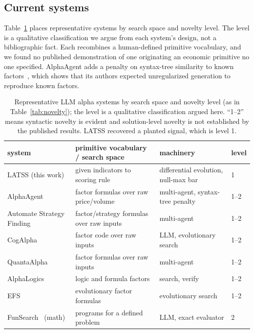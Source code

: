 \documentclass[11pt]{article}
\begin{document}
\subsection{Current systems}
\label{sec:audit}

Table~\ref{tab:audit} places representative systems by search space and novelty level. The level is a
qualitative classification we argue from each system's design, not a bibliographic fact. Each
recombines a human-defined primitive vocabulary, and we found no published demonstration of one
originating an economic primitive no one specified. AlphaAgent adds a penalty on syntax-tree similarity
to known factors~\cite{alphaagent}, which shows that its authors expected unregularized generation to
reproduce known factors.

\begin{table}[htbp]
\centering
\caption{Representative LLM alpha systems by search space and novelty level (as in
Table~\ref{tab:novelty}); the level is a qualitative classification argued here. ``1--2'' means
syntactic novelty is evident and solution-level novelty is not established by the published results.
LATSS recovered a planted signal, which is level 1.}
\label{tab:audit}
\small
\begin{tabular}{@{}p{3.3cm} p{5.3cm} p{2.1cm} p{1.4cm}@{}}
\toprule
system & primitive vocabulary / search space & machinery & level \\
\midrule
LATSS (this work) & given indicators to scoring rule & differential evolution, null-max bar & 1 \\
AlphaAgent~\cite{alphaagent} & factor formulas over raw price/volume & multi-agent, syntax-tree penalty & 1--2 \\
Automate Strategy Finding~\cite{automate} & factor/strategy formulas over raw inputs & multi-agent & 1--2 \\
CogAlpha~\cite{cogalpha} & factor code over raw inputs & LLM, evolutionary search & 1--2 \\
QuantaAlpha~\cite{quantaalpha} & factor formulas over raw inputs & multi-agent & 1--2 \\
AlphaLogics~\cite{alphalogics} & logic and formula factors & search, verify & 1--2 \\
EFS~\cite{efs} & evolutionary factor formulas & evolutionary search & 1--2 \\
FunSearch~\cite{funsearch} (math) & programs for a defined problem & LLM, exact evaluator & 2 \\
\bottomrule
\end{tabular}
\end{table}
\end{document}
